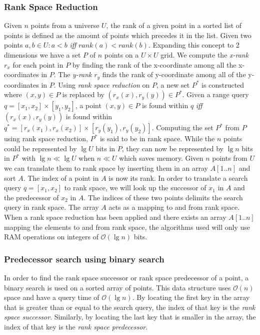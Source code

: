 \subsubsection{Rank Space Reduction}
Given $n$ points from a universe $U$, the rank of a given point in a sorted list of points is defined as the amount of points which precedes it in the list. Given two points $a,b \in U: a < b$ \emph{iff} $rank(a) < rank(b)$. Expanding this concept to 2 dimensions we have a set $P$ of $n$ points on a $U \times U$ grid. We compute the \emph{x-rank} $r_x$ for each point in $P$ by finding the rank of the x-coordinate among all the x-coordinates in $P$. The \emph{y-rank} $r_y$ finds the rank of y-coordinate among all of the y-coordinates in $P$. Using \emph{rank space reduction} on $P$, a new set $P^*$ is constructed where $(x,y) \in P$ is replaced by $(r_x(x), r_y(y)) \in P^*$. Given a range query $q = [x_1, x_2] \times [y_1, y_2]$, a point $(x,y) \in P$ is found within $q$ \emph{iff} $(r_x(x), r_y(y))$ is found within $q^* = [r_x(x_1), r_x(x_2)] \times [r_y(y_1), r_y(y_2)]$. Computing the set $P^*$ from $P$ using rank space reduction, $P^*$ is said to be in rank space. While the $n$ points could be represented by $\lg U$ bits in $P$, they can now be represented by $\lg n$ bits in $P^*$ with $\lg n \ll \lg U$ when $n \ll U$ which saves memory. Given $n$ points from $U$ we can translate them to rank space by inserting them in an array $A[1..n]$ and sort $A$. The index of a point in $A$ is now its rank. In order to translate a search query $q = [x_1, x_2]$ to rank space, we will look up the successor of $x_1$ in $A$ and the predecessor of $x_2$ in $A$. The indices of these two points delimits the search query in rank space. The array $A$ acts as a mapping to and from rank space. When a rank space reduction has been applied and there exists an array $A[1..n]$ mapping the elements to and from rank space, the algorithms used will only use RAM operations on integers of $\mathcal{O}(\lg n)$ bits.

\subsubsection{Predecessor search using binary search}
In order to find the rank space successor or rank space predecessor of a point, a binary search is used on a sorted array of points. This data structure uses $\mathcal{O}(n)$ space and have a query time of $\mathcal{O}(\lg n)$. By locating the first key in the array that is greater than or equal to the search query, the index of that key is the \emph{rank space successor}. Similarly, by locating the last key that is smaller in the array, the index of that key is the \emph{rank space predecessor}.



